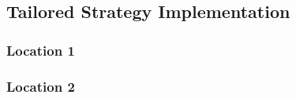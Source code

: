 \subsection{Tailored Strategy Implementation}

\subsubsection{Location 1}

\subsubsection{Location 2}


